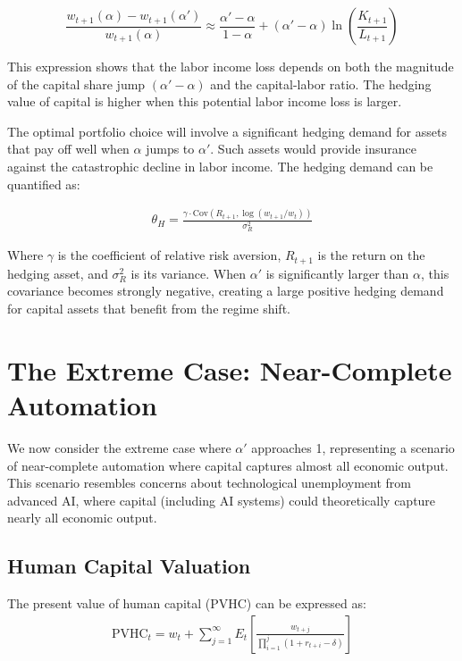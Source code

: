 \documentclass{article}
\theoremstyle{plain}    %
\theoremstyle{definition}  %
\begin{document}
\begin{equation}
\frac{w_{t+1}(\alpha) - w_{t+1}(\alpha')}{w_{t+1}(\alpha)} \approx \frac{\alpha' - \alpha}{1-\alpha} + (\alpha' - \alpha)\ln\left(\frac{K_{t+1}}{L_{t+1}}\right)
\end{equation}

This expression shows that the labor income loss depends on both the magnitude of the capital share jump $(\alpha' - \alpha)$ and the capital-labor ratio. The hedging value of capital is higher when this potential labor income loss is larger.

The optimal portfolio choice will involve a significant hedging demand for assets that pay off well when $\alpha$ jumps to $\alpha'$. Such assets would provide insurance against the catastrophic decline in labor income. The hedging demand can be quantified as:

\begin{align}
\theta_H = \frac{\gamma \cdot \text{Cov}(R_{t+1}, \log(w_{t+1}/w_t))}{\sigma^2_R}
\end{align}

Where $\gamma$ is the coefficient of relative risk aversion, $R_{t+1}$ is the return on the hedging asset, and $\sigma^2_R$ is its variance. When $\alpha'$ is significantly larger than $\alpha$, this covariance becomes strongly negative, creating a large positive hedging demand for capital assets that benefit from the regime shift.

\section{The Extreme Case: Near-Complete Automation}

We now consider the extreme case where $\alpha'$ approaches 1, representing a scenario of near-complete automation where capital captures almost all economic output. This scenario resembles concerns about technological unemployment from advanced AI, where capital (including AI systems) could theoretically capture nearly all economic output.

\subsection{Human Capital Valuation}

The present value of human capital (PVHC) can be expressed as:
\begin{align}
\text{PVHC}_t = w_t + \sum_{j=1}^{\infty}E_t\left[\frac{w_{t+j}}{\prod_{i=1}^{j}(1+r_{t+i}-\delta)}\right]
\end{align}
\end{document}
